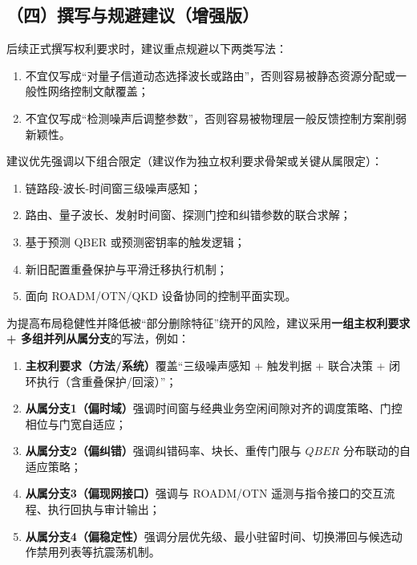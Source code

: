 \documentclass[12pt,a4paper]{article}
\begin{document}
\subsection*{（四）撰写与规避建议（增强版）}

后续正式撰写权利要求时，建议重点规避以下两类写法：
\begin{enumerate}[label=(\arabic*)]
    \item 不宜仅写成“对量子信道动态选择波长或路由”，否则容易被静态资源分配或一般性网络控制文献覆盖；
    \item 不宜仅写成“检测噪声后调整参数”，否则容易被物理层一般反馈控制方案削弱新颖性。
\end{enumerate}

建议优先强调以下组合限定（建议作为独立权利要求骨架或关键从属限定）：
\begin{enumerate}[label=(\arabic*)]
    \item 链路段-波长-时间窗三级噪声感知；
    \item 路由、量子波长、发射时间窗、探测门控和纠错参数的联合求解；
    \item 基于预测 QBER 或预测密钥率的触发逻辑；
    \item 新旧配置重叠保护与平滑迁移执行机制；
    \item 面向 ROADM/OTN/QKD 设备协同的控制平面实现。
\end{enumerate}

为提高布局稳健性并降低被“部分删除特征”绕开的风险，建议采用\textbf{一组主权利要求 + 多组并列从属分支}的写法，例如：
\begin{enumerate}[label=(\arabic*)]
    \item \textbf{主权利要求（方法/系统）}覆盖“三级噪声感知 + 触发判据 + 联合决策 + 闭环执行（含重叠保护/回滚）”；
    \item \textbf{从属分支1（偏时域）}强调时间窗与经典业务空闲间隙对齐的调度策略、门控相位与门宽自适应；
    \item \textbf{从属分支2（偏纠错）}强调纠错码率、块长、重传门限与 $QBER$ 分布联动的自适应策略；
    \item \textbf{从属分支3（偏现网接口）}强调与 ROADM/OTN 遥测与指令接口的交互流程、执行回执与审计输出；
    \item \textbf{从属分支4（偏稳定性）}强调分层优先级、最小驻留时间、切换滞回与候选动作禁用列表等抗震荡机制。
\end{enumerate}
\end{document}

